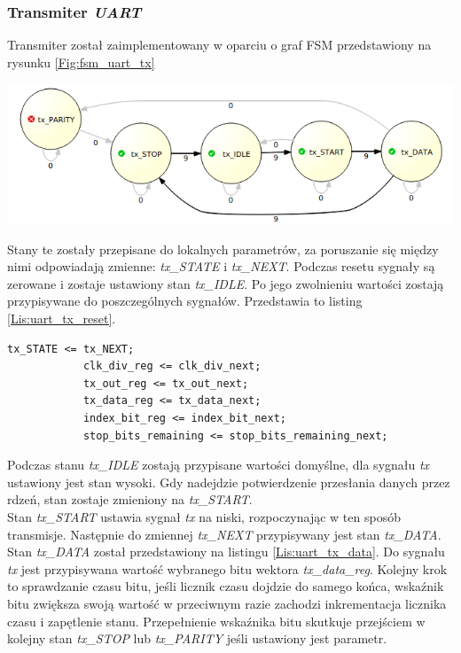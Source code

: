 \documentclass[11pt,a4paper]{article}
\begin{document}
	\subsubsection{Transmiter \textit{UART}}
	Transmiter został zaimplementowany w oparciu o graf FSM przedstawiony na rysunku \ref{Fig:fsm_uart_tx}\\
				\begin{minipage}[c]{\textwidth}
					\includegraphics[width=\textwidth]{./rysunki/uart_tx_fsm.png}
			\end{minipage}
		Stany te zostały przepisane do lokalnych parametrów, za poruszanie się między nimi odpowiadają zmienne: \textit{tx\_STATE} i \textit{tx\_NEXT}. Podczas resetu sygnały są zerowane i zostaje ustawiony stan \textit{tx\_IDLE}. Po jego zwolnieniu wartości zostają przypisywane do poszczególnych sygnałów. Przedstawia to listing \ref{Lis:uart_tx_reset}.\\
\begin{minipage}{\textwidth}
\begin{scriptsize}
\begin{lstlisting}[label=Lis:uart_tx_reset,caption=Transmiter \textit{UART} po resecie]
			tx_STATE <= tx_NEXT;
			clk_div_reg <= clk_div_next;
			tx_out_reg <= tx_out_next;
			tx_data_reg <= tx_data_next;
			index_bit_reg <= index_bit_next;
			stop_bits_remaining <= stop_bits_remaining_next;
\end{lstlisting}
\end{scriptsize}
\end{minipage}
Podczas stanu \textit{tx\_IDLE} zostają przypisane wartości domyślne, dla sygnału \textit{tx} ustawiony jest stan wysoki. Gdy nadejdzie potwierdzenie przesłania danych przez rdzeń, stan zostaje zmieniony na \textit{tx\_START}.\\
Stan \textit{tx\_START} ustawia sygnał \textit{tx} na niski, rozpoczynając w ten sposób transmisje. Następnie do zmiennej \textit{tx\_NEXT} przypisywany jest stan \textit{tx\_DATA}.\\
Stan \textit{tx\_DATA} został przedstawiony na listingu \ref{Lis:uart_tx_data}. Do sygnału \textit{tx} jest przypisywana wartość wybranego bitu wektora \textit{tx\_data\_reg}. Kolejny krok to sprawdzanie czasu bitu, jeśli licznik czasu dojdzie do samego końca, wskaźnik bitu zwiększa swoją wartość w przeciwnym razie zachodzi inkrementacja licznika czasu i zapętlenie stanu. Przepełnienie wskaźnika bitu skutkuje przejściem w kolejny stan \textit{tx\_STOP} lub \textit{tx\_PARITY} jeśli ustawiony jest parametr.\\
\end{document}
